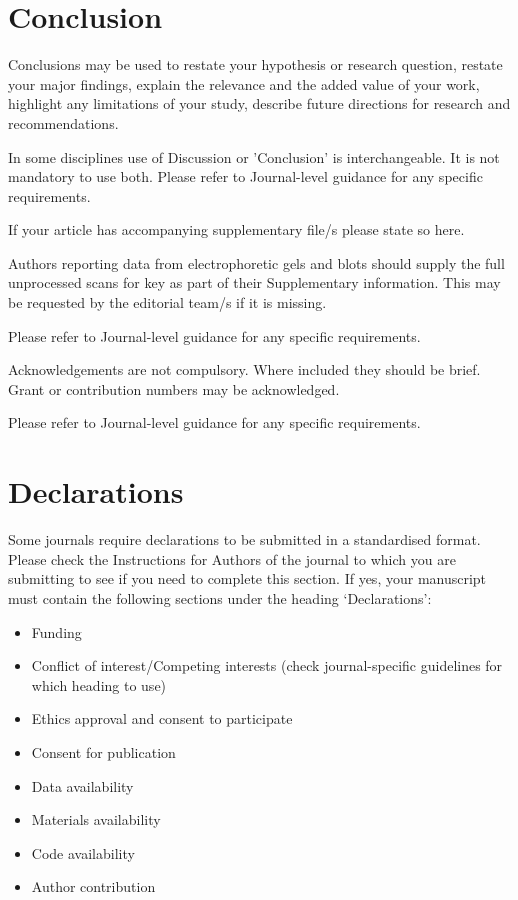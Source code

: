 \documentclass[sn-mathphys-num]{sn-jnl}%
\theoremstyle{thmstyleone}%
\theoremstyle{thmstyletwo}%
\theoremstyle{thmstylethree}%
\begin{document}
\section{Conclusion}\label{sec13}

Conclusions may be used to restate your hypothesis or research question, restate your major findings, explain the relevance and the added value of your work, highlight any limitations of your study, describe future directions for research and recommendations. 

In some disciplines use of Discussion or 'Conclusion' is interchangeable. It is not mandatory to use both. Please refer to Journal-level guidance for any specific requirements. 

\backmatter


If your article has accompanying supplementary file/s please state so here. 

Authors reporting data from electrophoretic gels and blots should supply the full unprocessed scans for key as part of their Supplementary information. This may be requested by the editorial team/s if it is missing.

Please refer to Journal-level guidance for any specific requirements.


Acknowledgements are not compulsory. Where included they should be brief. Grant or contribution numbers may be acknowledged.

Please refer to Journal-level guidance for any specific requirements.

\section*{Declarations}

Some journals require declarations to be submitted in a standardised format. Please check the Instructions for Authors of the journal to which you are submitting to see if you need to complete this section. If yes, your manuscript must contain the following sections under the heading `Declarations':

\begin{itemize}
\item Funding
\item Conflict of interest/Competing interests (check journal-specific guidelines for which heading to use)
\item Ethics approval and consent to participate
\item Consent for publication
\item Data availability 
\item Materials availability
\item Code availability 
\item Author contribution
\end{itemize}
\end{document}
